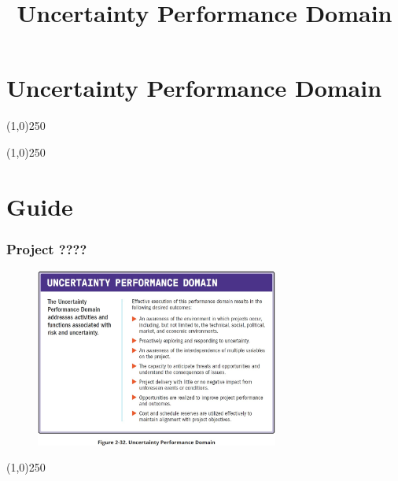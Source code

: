 



%
\title[Project Management \& BIM]{Uncertainty Performance Domain}



%
\usetikzlibrary{arrows}



\newpage




\thispagestyle{empty}
\tableofcontents
\newpage
\section{Uncertainty Performance Domain}


\begin{frame}
\titlepage
\end{frame}\begin{center}\line(1,0){250}\end{center}
%
%
\begin{center}\line(1,0){250}\end{center}


\section{Guide}



\begin{frame}
\frametitle{Project ????}
 \begin{figure}
    \centering
        \includegraphics[width = 8cm]{../images/guide/Fig2-32.jpg}
    \label{guidefig:2-32}
 \end{figure}
\end{frame}
\begin{center}\line(1,0){250}\end{center}

